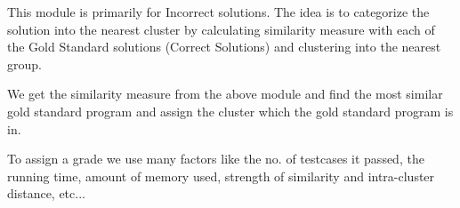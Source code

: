     This module is primarily for Incorrect solutions. The idea is to categorize the solution into the nearest cluster by calculating similarity measure with each of the Gold Standard solutions (Correct Solutions) and clustering into the nearest group.
    
    We get the similarity measure from the above module and find the most similar gold standard program and assign the cluster which the gold standard program is in.
    
    To assign a grade we use many factors like the no. of testcases it passed, the running time, amount of memory used, strength of similarity and intra-cluster distance, etc...
    
